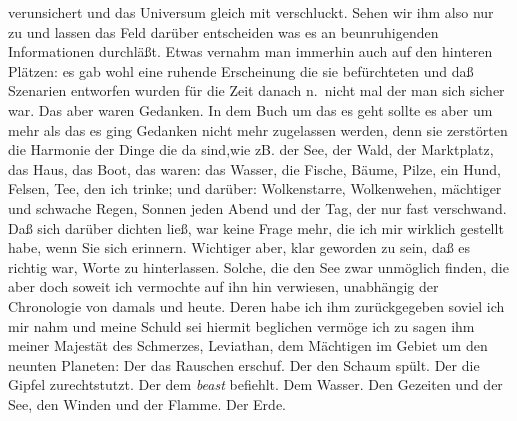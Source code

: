 \documentclass[
]{article}
\begin{document}
verunsichert und das Universum gleich mit verschluckt. Sehen wir ihm
also nur zu und lassen das Feld darüber entscheiden was es an
beunruhigenden Informationen durchläßt. Etwas vernahm man immerhin auch
auf den hinteren Plätzen: es gab wohl eine ruhende Erscheinung die sie
befürchteten und daß Szenarien entworfen wurden für die Zeit danach
n.~nicht mal der man sich sicher war. Das aber waren Gedanken. In dem
Buch um das es geht sollte es aber um mehr als das es ging Gedanken
nicht mehr zugelassen werden, denn sie zerstörten die Harmonie der Dinge
die da sind,wie zB. der See, der Wald, der Marktplatz, das Haus, das
Boot, das waren: das Wasser, die Fische, Bäume, Pilze, ein Hund, Felsen,
Tee, den ich trinke; und darüber: Wolkenstarre, Wolkenwehen, mächtiger
und schwache Regen, Sonnen jeden Abend und der Tag, der nur fast
verschwand. Daß sich darüber dichten ließ, war keine Frage mehr, die ich
mir wirklich gestellt habe, wenn Sie sich erinnern. Wichtiger aber, klar
geworden zu sein, daß es richtig war, Worte zu hinterlassen. Solche, die
den See zwar unmöglich finden, die aber doch soweit ich vermochte auf
ihn hin verwiesen, unabhängig der Chronologie von damals und heute.
Deren habe ich ihm zurückgegeben soviel ich mir nahm und meine Schuld
sei hiermit beglichen vermöge ich zu sagen ihm meiner Majestät des
Schmerzes, Leviathan, dem Mächtigen im Gebiet um den neunten Planeten:
Der das Rauschen erschuf. Der den Schaum spült. Der die Gipfel
zurechtstutzt. Der dem \emph{beast }befiehlt. Dem Wasser. Den Gezeiten
und der See, den Winden und der Flamme. Der Erde.
\end{document}
